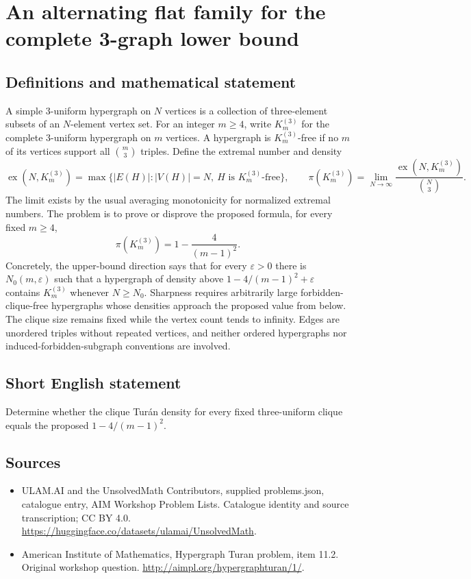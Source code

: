\documentclass[11pt,a4paper]{article}
\begin{document}
\section*{An alternating flat family for the complete 3-graph lower bound}\label{statement}

\subsection{Definitions and mathematical statement}
A simple $3$-uniform hypergraph on $N$ vertices is a collection of three-element subsets of an $N$-element vertex set.
For an integer $m\geq4$, write $K_m^{(3)}$ for the complete $3$-uniform hypergraph on $m$ vertices.
A hypergraph is $K_m^{(3)}$-free if no $m$ of its vertices support all $\binom m3$ triples.
Define the extremal number and density
\[
 \operatorname{ex}(N,K_m^{(3)})
   =\max\{|E(H)|:|V(H)|=N,\ H\text{ is }K_m^{(3)}\text{-free}\},
 \qquad
 \pi(K_m^{(3)})=\lim_{N\to\infty}
       \frac{\operatorname{ex}(N,K_m^{(3)})}{\binom N3}.
\]
The limit exists by the usual averaging monotonicity for normalized extremal numbers.
The problem is to prove or disprove the proposed formula, for every fixed $m\geq4$,
\[
 \pi(K_m^{(3)})=1-\frac{4}{(m-1)^2}.
\]
Concretely, the upper-bound direction says that for every $\varepsilon>0$ there is $N_0(m,\varepsilon)$ such that a hypergraph of density above $1-4/(m-1)^2+\varepsilon$ contains $K_m^{(3)}$ whenever $N\geq N_0$.
Sharpness requires arbitrarily large forbidden-clique-free hypergraphs whose densities approach the proposed value from below.
The clique size remains fixed while the vertex count tends to infinity.
Edges are unordered triples without repeated vertices, and neither ordered hypergraphs nor induced-forbidden-subgraph conventions are involved.
\subsection{Short English statement}
Determine whether the clique Turán density for every fixed three-uniform clique equals the proposed $1-4/(m-1)^2$.
\subsection{Sources}
\begin{itemize}
\item[S1] ULAM.AI and the UnsolvedMath Contributors, supplied problems.json, catalogue entry, AIM Workshop Problem Lists. Catalogue identity and source transcription; CC BY 4.0.
\url{https://huggingface.co/datasets/ulamai/UnsolvedMath}.
\item[S2] American Institute of Mathematics, Hypergraph Turan problem, item 11.2. Original workshop question.
\url{http://aimpl.org/hypergraphturan/1/}.
\end{itemize}
\end{document}
